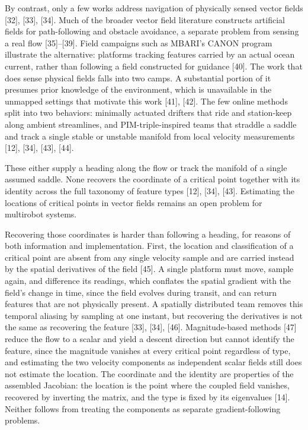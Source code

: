 \documentclass[lettersize,journal]{IEEEtran}
\begin{document}
By contrast, only a few works address navigation of physically sensed vector fields [32], [33], [34]. Much of the broader vector field literature constructs artificial fields for path-following and obstacle avoidance, a separate problem from sensing a real flow [35]--[39]. Field campaigns such as MBARI's CANON program illustrate the alternative: platforms tracking features carried by an actual ocean current, rather than following a field constructed for guidance [40]. The work that does sense physical fields falls into two camps. A substantial portion of it presumes prior knowledge of the environment, which is unavailable in the unmapped settings that motivate this work [41], [42]. The few online methods split into two behaviors: minimally actuated drifters that ride and station-keep along ambient streamlines, and PIM-triple-inspired teams that straddle a saddle and track a single stable or unstable manifold from local velocity measurements [12], [34], [43], [44].

These either supply a heading along the flow or track the manifold of a single assumed saddle. None recovers the coordinate of a critical point together with its identity across the full taxonomy of feature types [12], [34], [43]. Estimating the locations of critical points in vector fields remains an open problem for multirobot systems.

Recovering those coordinates is harder than following a heading, for reasons of both information and implementation. First, the location and classification of a critical point are absent from any single velocity sample and are carried instead by the spatial derivatives of the field [45]. A single platform must move, sample again, and difference its readings, which conflates the spatial gradient with the field's change in time, since the field evolves during transit, and can return features that are not physically present. A spatially distributed team removes this temporal aliasing by sampling at one instant, but recovering the derivatives is not the same as recovering the feature [33], [34], [46]. Magnitude-based methods [47] reduce the flow to a scalar and yield a descent direction but cannot identify the feature, since the magnitude vanishes at every critical point regardless of type, and estimating the two velocity components as independent scalar fields still does not estimate the location. The coordinate and the identity are properties of the assembled Jacobian: the location is the point where the coupled field vanishes, recovered by inverting the matrix, and the type is fixed by its eigenvalues [14]. Neither follows from treating the components as separate gradient-following problems.
\end{document}
